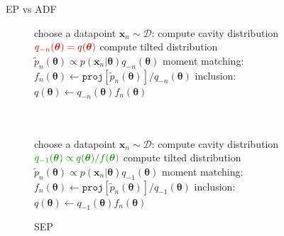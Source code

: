 \documentclass[mathserif]{beamer}
\begin{document}
\begin{frame}{EP vs ADF}

\begin{figure}[!t]
\begin{minipage}[t]{0.45\linewidth}
\centering
\begin{algorithm}[H] 
\renewcommand{\thealgorithm}{}
\caption{ADF} \small
\label{alg:adf} 
\begin{algorithmic}[1] 
	\STATE \small choose a datapoint $\bm{x}_n\sim \mathcal{D}$:
	\STATE compute cavity distribution \\$\color{dkred}q_{-n}(\bm{\theta}) = q(\bm{\theta})$
	\STATE compute tilted distribution \\$\tilde{p}_n(\bm{\theta}) \propto p(\bm{x}_n|\bm{\theta}) q_{-n}(\bm{\theta})$
	\STATE moment matching: \\ \hspace{-1mm}$f_n(\bm{\theta}) \leftarrow \mathtt{proj}[\tilde{p}_n(\bm{\theta})] / q_{-n}(\bm{\theta}) $
	\STATE inclusion:\\ $q(\bm{\theta}) \leftarrow q_{-n}(\bm{\theta}) f_n(\bm{\theta})$\\\hspace{1mm}\\ \vspace{1.5mm} \hspace{1mm}\\
\end{algorithmic}
\end{algorithm}
\end{minipage}
\begin{minipage}[t]{0.45\linewidth}
\centering
\begin{algorithm}[H]
\renewcommand{\thealgorithm}{}
\caption{SEP} \small
\label{alg:sep} 
\begin{algorithmic}[1] 
	\STATE \small choose a datapoint $\bm{x}_n\sim \mathcal{D}$:
	\STATE compute cavity distribution \\ $\color{dkgreen}q_{-1}(\bm{\theta}) \propto q(\bm{\theta}) / f(\bm{\theta})$
	\STATE compute tilted distribution \\$\tilde{p}_n(\bm{\theta}) \propto p(\bm{x}_n|\bm{\theta}) q_{-1}(\bm{\theta})$
	\STATE moment matching: \\\hspace{-1mm}$f_n(\bm{\theta}) \leftarrow \mathtt{proj}[\tilde{p}_n(\bm{\theta})] / q_{-1}(\bm{\theta}) $
	\STATE inclusion:\\ $q(\bm{\theta}) \leftarrow q_{-1}(\bm{\theta}) f_n(\bm{\theta})$
\end{algorithmic}
\end{algorithm}
\end{minipage} 
\end{figure}
\end{frame}
\end{document}
